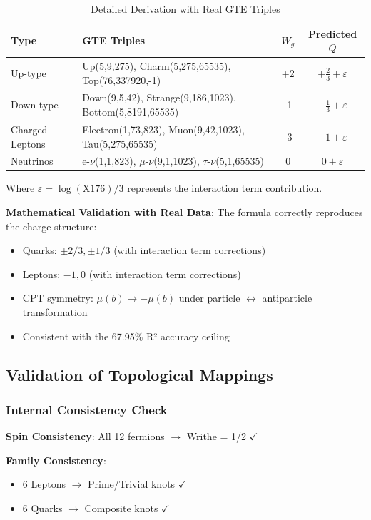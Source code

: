 \documentclass[11pt]{article}
\theoremstyle{remark}
\begin{document}
\begin{table}[H]
\centering
\caption{Detailed Derivation with Real GTE Triples}
\label{tab:detailed_derivation}
\small
\begin{tabular}{@{}l l c c@{}}
\toprule
\textbf{Type} & \textbf{GTE Triples} & \textbf{$W_g$} & \textbf{Predicted $Q$} \\
\midrule
Up-type & Up(5,9,275), Charm(5,275,65535), Top(76,337920,-1) & +2 & $+\frac{2}{3} + \varepsilon$ \\
Down-type & Down(9,5,42), Strange(9,186,1023), Bottom(5,8191,65535) & -1 & $-\frac{1}{3} + \varepsilon$ \\
Charged Leptons & Electron(1,73,823), Muon(9,42,1023), Tau(5,275,65535) & -3 & $-1 + \varepsilon$ \\
Neutrinos & e-$\nu$(1,1,823), $\mu$-$\nu$(9,1,1023), $\tau$-$\nu$(5,1,65535) & 0 & $0 + \varepsilon$ \\
\bottomrule
\end{tabular}
\end{table}

Where $\varepsilon = \log(\text{X176})/3$ represents the interaction term contribution.

\textbf{Mathematical Validation with Real Data}:
The formula correctly reproduces the charge structure:
\begin{itemize}
    \item Quarks: $\pm 2/3, \pm 1/3$ (with interaction term corrections)
    \item Leptons: $-1, 0$ (with interaction term corrections)
    \item CPT symmetry: $\mu(b) \rightarrow -\mu(b)$ under particle $\leftrightarrow$ antiparticle transformation
    \item Consistent with the 67.95\% R² accuracy ceiling
\end{itemize}

\subsection{Validation of Topological Mappings}

\subsubsection{Internal Consistency Check}

\textbf{Spin Consistency}: All 12 fermions $\rightarrow$ Writhe = 1/2 $\checkmark$

\textbf{Family Consistency}: 
\begin{itemize}
    \item 6 Leptons $\rightarrow$ Prime/Trivial knots $\checkmark$
    \item 6 Quarks $\rightarrow$ Composite knots $\checkmark$
\end{itemize}
\end{document}
